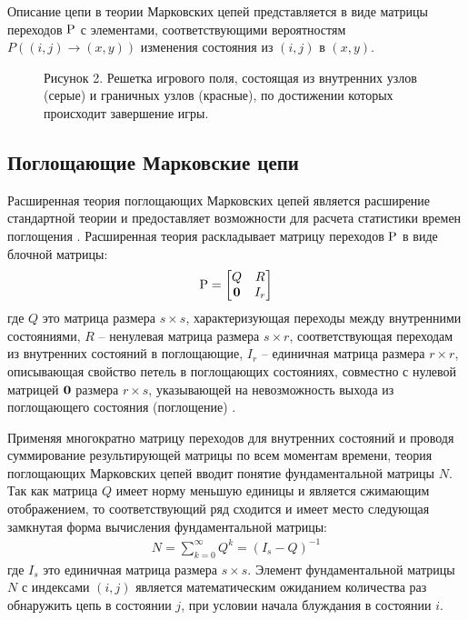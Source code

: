 Описание цепи в теории Марковских цепей представляется в виде матрицы переходов \cite{kemeny1983} $\rm P$ с элементами, 
соответствующими вероятностям $P((i, j) \rightarrow (x, y))$ изменения состояния из $(i, j)$ в $(x, y)$.

\begin{figure}[ht]
    \caption{
        Рисунок 2. Решетка игрового поля, состоящая из внутренних узлов (серые) и граничных узлов (красные), по достижении которых происходит завершение игры.
    }\label{fig:game_field}
\end{figure}


\subsection{Поглощающие Марковские цепи}\label{subsec:ch1/sec3/sub2}

Расширенная теория поглощающих Марковских цепей является расширение стандартной теории и предоставляет возможности 
для расчета статистики времен поглощения \cite{kemeny1983}. 
Расширенная теория раскладывает матрицу переходов ${\rm P}$ в виде блочной матрицы:
\begin{equation}
    \begin{aligned}
    {\rm P}=
      \begin{bmatrix}
        Q & R \\
        {\bf 0} & I_r
      \end{bmatrix}
    \label{eq:P}
    \end{aligned}
\end{equation}
где $Q$ это матрица размера $s \times s$, характеризующая переходы между внутренними состояниями, 
$R$ -- ненулевая матрица размера $s \times r$, соответствующая переходам из внутренних состояний в поглощающие, 
$I_r$ -- единичная матрица размера $r \times r$, описывающая свойство петель в поглощающих состояниях, совместно с нулевой матрицей
${\bf 0}$ размера $r \times s$, указывающей на невозможность выхода из поглощающего состояния (поглощение) \cite{kemeny1983}.

Применяя многократно матрицу переходов для внутренних состояний и проводя суммирование результирующей матрицы по всем моментам времени,
теория поглощающих Марковских цепей вводит понятие фундаментальной матрицы $N$. Так как матрица $Q$ имеет норму меньшую единицы и является сжимающим отображением,
то соответствующий ряд сходится и имеет место следующая замкнутая форма вычисления фундаментальной матрицы:
\begin{equation}
    \begin{aligned}
    N=\sum_{k=0}^{\infty} Q^k=(I_s-Q)^{-1}
    \label{eq:N}
    \end{aligned}
\end{equation}
где $I_s$ это единичная матрица размера $s \times s$. Элемент фундаментальной матрицы $N$ с индексами $(i, j)$ 
является математическим ожиданием количества раз обнаружить цепь в состоянии $j$, при условии начала блуждания в состоянии $i$.

